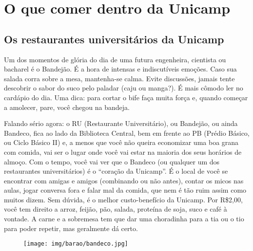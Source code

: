 
%
%
%

\section{O que comer dentro da Unicamp}
\subsection{Os restaurantes universitários da Unicamp}

Um dos momentos de glória do dia de uma futura engenheira, cientista ou
bacharel é o Bandejão. É a hora de intensas e indiscutíveis emoções. Caso sua
salada corra sobre a mesa, mantenha-se calma. Evite discussões, jamais tente
descobrir o sabor do suco pelo paladar (caju ou manga?). É mais cômodo ler no
cardápio do dia. Uma dica: para cortar o bife faça muita força e, quando
começar a amolecer, pare, você chegou na bandeja.

Falando sério agora: o RU (Restaurante Universitário), ou Bandejão, ou ainda
Bandeco, fica ao lado da Biblioteca Central, bem em frente ao PB (Prédio
Básico, ou Ciclo Básico II) e, a menos que você não queira economizar uma boa
grana com comida, vai ser o lugar onde você vai estar na maioria dos seus
horários de almoço. Com o tempo, você vai ver que o Bandeco (ou qualquer um dos
restaurantes universitários) é o ``coração da Unicamp''. É o local de você se
encontrar com amigas e amigos (combinando ou não antes), contar os micos nas
aulas, jogar conversa fora e falar mal da comida, que nem é tão ruim assim como
muitos dizem. Sem dúvida, é o melhor custo-benefício da Unicamp. Por R\$2,00,
você tem direito a arroz, feijão, pão, salada, proteína de soja, suco e café à
vontade. A carne e a sobremesa tem que dar uma choradinha para a tia ou o tio
para poder repetir, mas geralmente dá certo.

\begin{figure}[h!]
    \centering
    \texttt{[image: img/barao/bandeco.jpg]}
\end{figure}

